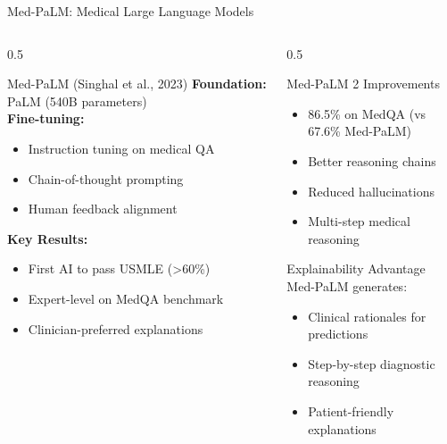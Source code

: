 \documentclass[aspectratio=169]{beamer}
\begin{document}
\begin{frame}{Med-PaLM: Medical Large Language Models}
    \begin{columns}
        \begin{column}{0.5\textwidth}
            \begin{block}{Med-PaLM (Singhal et al., 2023)}
                \textbf{Foundation:} PaLM (540B parameters) \\
                \textbf{Fine-tuning:}
                \begin{itemize}
                    \item Instruction tuning on medical QA
                    \item Chain-of-thought prompting
                    \item Human feedback alignment
                \end{itemize}
                
                \vspace{0.5em}
                \textbf{Key Results:}
                \begin{itemize}
                    \item First AI to pass USMLE (>60\%)
                    \item Expert-level on MedQA benchmark
                    \item Clinician-preferred explanations
                \end{itemize}
            \end{block}
        \end{column}
        \begin{column}{0.5\textwidth}
            \begin{block}{Med-PaLM 2 Improvements}
                \begin{itemize}
                    \item 86.5\% on MedQA (vs 67.6\% Med-PaLM)
                    \item Better reasoning chains
                    \item Reduced hallucinations
                    \item Multi-step medical reasoning
                \end{itemize}
            \end{block}
            
            \begin{alertblock}{Explainability Advantage}
                Med-PaLM generates:
                \begin{itemize}
                    \item Clinical rationales for predictions
                    \item Step-by-step diagnostic reasoning
                    \item Patient-friendly explanations
                \end{itemize}
            \end{alertblock}
        \end{column}
    \end{columns}
\end{frame}
\end{document}
